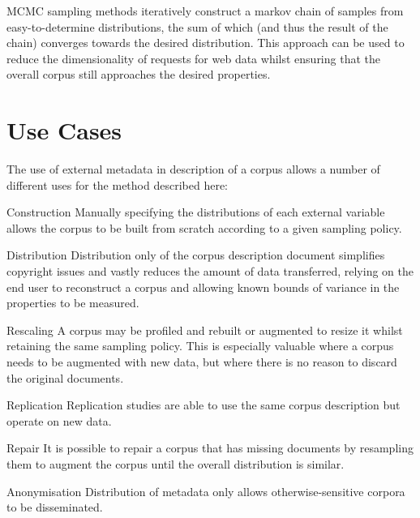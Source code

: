 MCMC sampling methods iteratively construct a markov chain of samples from easy-to-determine distributions, the sum of which (and thus the result of the chain) converges towards the desired distribution.  This approach can be used to reduce the dimensionality of requests for web data whilst ensuring that the overall corpus still approaches the desired properties.
     


\section{Use Cases}
\label{sec:rebuilding:rationale:usecases}
The use of external metadata in description of a corpus allows a number of different uses for the method described here:


\begin{itemizeTitle}
    \item[Construction] Manually specifying the distributions of each external variable allows the corpus to be built from scratch according to a given sampling policy.

    \item[Distribution] Distribution only of the corpus description document simplifies copyright issues and vastly reduces the amount of data transferred, relying on the end user to reconstruct a corpus and allowing known bounds of variance in the properties to be measured.

    \item[Rescaling] A corpus may be profiled and rebuilt or augmented to resize it whilst retaining the same sampling policy.  This is especially valuable where a corpus needs to be augmented with new data, but where there is no reason to discard the original documents.

    \item[Replication] Replication studies are able to use the same corpus description but operate on new data.

    \item[Repair] It is possible to repair a corpus that has missing documents by resampling them to augment the corpus until the overall distribution is similar.

    \item[Anonymisation] Distribution of metadata only allows otherwise-sensitive corpora to be disseminated.
\end{itemizeTitle}




